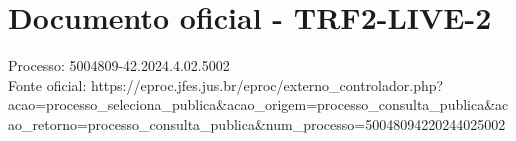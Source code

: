 \documentclass[12pt]{article}
\begin{document}
\section*{Documento oficial - TRF2-LIVE-2}
Processo: 5004809-42.2024.4.02.5002\\
Fonte oficial: https://eproc.jfes.jus.br/eproc/externo\_controlador.php?acao=processo\_seleciona\_publica\&acao\_origem=processo\_consulta\_publica\&acao\_retorno=processo\_consulta\_publica\&num\_processo=50048094220244025002\\
\end{document}
